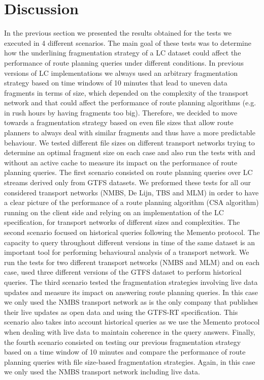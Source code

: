 \documentclass[sw]{iosart2x}
\begin{document}
	\section{Discussion}
	In the previous section we presented the results obtained for the tests we executed in 4 different scenarios. The main goal of these tests was to determine how the underlining fragmentation strategy of a LC dataset could affect the performance of route planning queries under different conditions. In previous versions of LC implementations we always used an arbitrary fragmentation strategy based on time windows of 10 minutes that lead to uneven data fragments in terms of size, which depended on the complexity of the transport network and that could affect the performance of route planning algorithms (e.g. in rush hours by having fragments too big). Therefore, we decided to move towards a fragmentation strategy based on even file sizes that allow route planners to always deal with similar fragments and thus have a more predictable behaviour. We tested different file sizes on different transport networks trying to determine an optimal fragment size on each case and also run the tests with and without an active cache to measure its impact on the performance of route planning queries. The first scenario consisted on route planning queries over LC streams derived only from GTFS datasets. We preformed these tests for all our considered transport networks (NMBS, De Lijn, TBS and MLM) in order to have a clear picture of the performance of a route planning algorithm (CSA algorithm) running on the client side and relying on an implementation of the LC specification, for transport networks of different sizes and complexities. The second scenario focused on historical queries following the Memento protocol. The capacity to query throughout different versions in time of the same dataset is an important tool for performing behavioural analysis of a transport network. We run the tests for two different transport networks (NMBS and MLM) and on each case, used three different versions of the GTFS dataset to perform historical queries. The third scenario tested the fragmentation strategies involving live data updates and measure its impact on answering route planning queries. In this case we only used the NMBS transport network as is the only company that publishes their live updates as open data and using the GTFS-RT specification. This scenario also takes into account historical queries as we use the Memento protocol when dealing with live data to maintain coherence in the query answers. Finally, the fourth scenario consisted on testing our previous fragmentation strategy based on a time window of 10 minutes and compare the performance of route planning queries with file size-based fragmentation strategies. Again, in this case we only used the NMBS transport network including live data.
	
\end{document}
